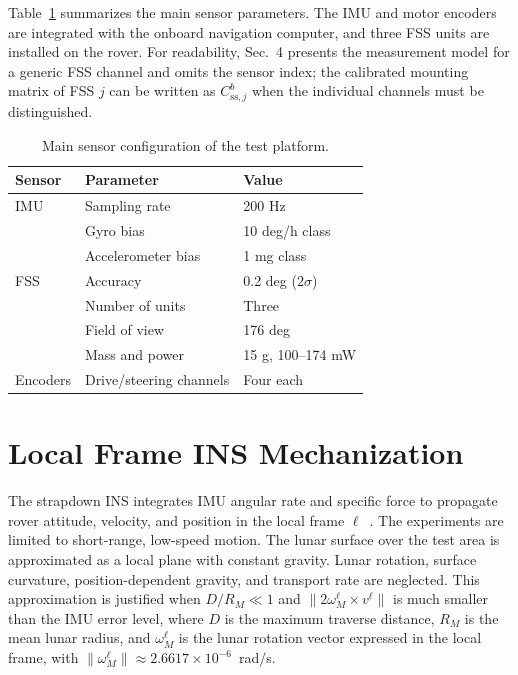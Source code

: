 \documentclass[]{IAC_style}
\begin{document}
Table~\ref{tab:sensors} summarizes the main sensor parameters. The IMU and motor encoders are integrated with the onboard navigation computer, and three FSS units are installed on the rover. For readability, Sec.~4 presents the measurement model for a generic FSS channel and omits the sensor index; the calibrated mounting matrix of FSS $j$ can be written as $C_{\mathrm{ss},j}^b$ when the individual channels must be distinguished.

\begin{table}[t]
\centering
\caption{Main sensor configuration of the test platform.}
\label{tab:sensors}
\scriptsize
\begin{tabularx}{\columnwidth}{p{}p{}X}
\toprule
\textbf{Sensor} & \textbf{Parameter} & \textbf{Value} \\
\midrule
IMU & Sampling rate & 200 Hz \\
 & Gyro bias & 10 deg/h class \\
 & Accelerometer bias & 1 mg class \\
FSS & Accuracy & 0.2 deg ($2\sigma$) \\
 & Number of units & Three \\
 & Field of view & 176 deg \\
 & Mass and power & 15 g, 100--174 mW \\
Encoders & Drive/steering channels & Four each \\
\bottomrule
\end{tabularx}
\end{table}

\section{Local Frame INS Mechanization}

The strapdown INS integrates IMU angular rate and specific force to propagate rover attitude, velocity, and position in the local frame $\ell$~\cite{titterton2004strapdown,groves2013principles}. The experiments are limited to short-range, low-speed motion. The lunar surface over the test area is approximated as a local plane with constant gravity. Lunar rotation, surface curvature, position-dependent gravity, and transport rate are neglected. This approximation is justified when $D/R_M\ll1$ and $\lVert 2\omega_M^\ell\times v^\ell\rVert$ is much smaller than the IMU error level, where $D$ is the maximum traverse distance, $R_M$ is the mean lunar radius, and $\omega_M^\ell$ is the lunar rotation vector expressed in the local frame, with $\lVert\omega_M^\ell\rVert\approx2.6617\times10^{-6}$~rad/s.
\end{document}
